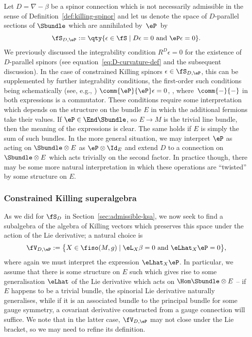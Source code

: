Let $D=\nabla-\beta$ be a spinor connection which is not necessarily admissible in the sense of Definition~\ref{def:killing-spinor} and let us denote the space of $D$-parallel sections of $\Sbundle$ which are annihilated by~$\eP$~by
\[
	\fS_{D,\eP} := \qty{\epsilon\in\fS\mid D\epsilon = 0 \text{ and } \eP\epsilon = 0}.
\]
We previously discussed the integrability condition $R^D\epsilon=0$ for the existence of $D$-parallel spinors (see equation~\eqref{eq:D-curvature-def} and the subsequent discussion). In the case of constrained Killing spinors $\epsilon\in\fS_{D,\eP}$, this can be supplemented by further integrability conditions, the first-order such conditions being schematically (see, e.g., \cite{Gran2019})
$\comm{\eP}{\eP}\epsilon = 0$, ,
where~${\comm{-}{-}}$ in both expressions is a commutator. These conditions require some interpretation which depends on the structure on the bundle $E$ in which the additional fermions take their values. If $\eP\in\End\Sbundle$, so $E\to M$ is the trivial line bundle, then the meaning of the expressions is clear. The same holds if $E$ is simply the sum of such bundles. In the more general situation, we may interpret $\eP$ as acting on $\Sbundle\otimes E$ as $\eP\otimes\Id_E$ and extend $D$ to a connection on $\Sbundle\otimes E$ which acts trivially on the second factor. In practice though, there may be some more natural interpretation in which these operations are ``twisted'' by some structure on $E$.

\subsubsection{Constrained Killing superalgebra}

As we did for $\fS_D$ in Section~\ref{sec:admissible-ksa}, we now seek to find a subalgebra of the algebra of Killing vectors which preserves this space under the action of the Lie derivative; a natural choice is
\[
	\fV_{D,\eP} := \big\{X\in\fiso(M,g) \mid \eL_X \beta = 0 \text{ and } \eLhat_X \eP = 0\big\},
\]
where again we must interpret the expression $\eLhat_X \eP$. In particular, we assume that there is some structure on $E$ such which gives rise to some generalisation $\eLhat$ of the Lie derivative which acts on $\Hom\Sbundle\otimes E$ -- if $E$ happens to be a trivial bundle, the spinorial Lie derivative naturally generalises, while if it is an associated bundle to the principal bundle for some gauge symmetry, a covariant derivative constructed from a gauge connection will suffice. We note that in the latter case, $\fV_{D,\eP}$ may not close under the Lie bracket, so we may need to refine its definition.

